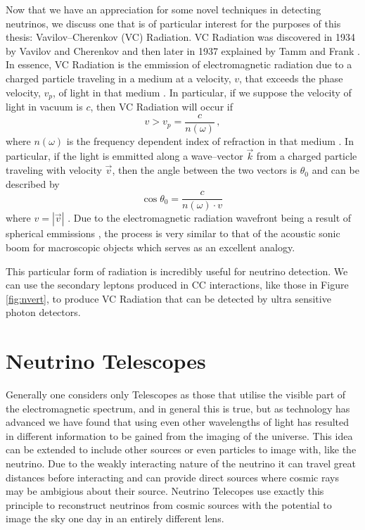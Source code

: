 Now that we have an appreciation for some novel techniques in detecting neutrinos, we discuss one that is of particular interest for the purposes of this thesis: Vavilov--Cherenkov (VC) Radiation. VC Radiation was discovered in 1934 by Vavilov \cite{vav_og} and Cherenkov \cite{cher_og} and then later in 1937 explained by Tamm and Frank \cite{tamm}. In essence, VC Radiation is the emmission of electromagnetic radiation due to a charged particle traveling in a medium at a velocity, $v$, that exceeds the phase velocity, $v_{p}$, of light in that medium \cite{ginz}. In particular, if we suppose the velocity of light in vacuum is $c$, then VC Radiation will occur if
\begin{equation}
  v > v_{p} = \frac{c}{n(\omega)}\, ,
\end{equation}
where $n(\omega)$ is the frequency dependent index of refraction in that medium \cite{ginz}. In particular, if the light is emmitted along a wave--vector $\vec{k}$ from a charged particle traveling with velocity $\vec{v}$, then the angle between the two vectors is $\theta_{0}$ and can be described by
\begin{equation}
  \cos\theta_{0} = \frac{c}{n(\omega)\cdot v}\,
\end{equation}
where $v = |\vec{v}|$ \cite{ginz}. Due to the electromagnetic radiation wavefront being a result of spherical emmissions \cite{ginz}, the process is very similar to that of the acoustic sonic boom for macroscopic objects \cite{ginz} which serves as an excellent analogy.

This particular form of radiation is incredibly useful for neutrino detection. We can use the secondary leptons produced in CC interactions, like those in Figure \ref{fig:nvert}, to produce VC Radiation that can be detected by ultra sensitive photon detectors. 

\section{Neutrino Telescopes}

Generally one considers only Telescopes as those that utilise the visible part of the electromagnetic spectrum, and in general this is true, but as technology has advanced we have found that using even other wavelengths of light has resulted in different information to be gained from the imaging of the universe. This idea can be extended to include other sources or even particles to image with, like the neutrino. Due to the weakly interacting nature of the neutrino it can travel great distances before interacting and can provide direct sources where cosmic rays may be ambigious about their source. Neutrino Telecopes use exactly this principle to reconstruct neutrinos from cosmic sources with the potential to image the sky one day in an entirely different lens.

